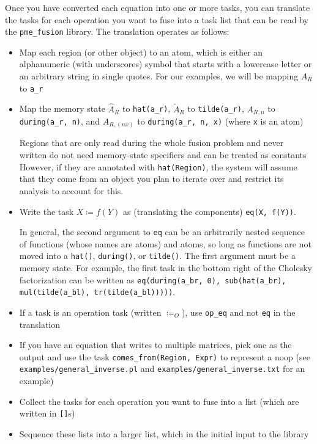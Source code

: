 \documentclass[12pt,letterpaper]{article}
\begin{document}
Once you have converted each equation into one or more tasks, you can translate the tasks for each operation you want to fuse into a task list that can be read by the \texttt{pme\_fusion} library.
The translation operates as follows:
\begin{itemize}
\item Map each region (or other object) to an atom, which is either an alphanumeric (with underscores) symbol that starts with a lowercase letter or an arbitrary string in single quotes. For our examples, we will be mapping $A_R$ to \texttt{a\_r}
\item Map the memory state $\hat{A}_R$ to \texttt{hat(a\_r)}, $\widetilde{A}_R$ to \texttt{tilde(a\_r)}, $A_{R, n}$ to \texttt{during(a\_r, n)}, and $A_{R, (n x)}$ to \texttt{during(a\_r, n, x)} (where \texttt{x} is an atom)

  Regions that are only read during the whole fusion problem and never written do not need memory-state specifiers and can be treated as constants
  However, if they are annotated with \texttt{hat(Region)}, the system will assume that they come from an object you plan to iterate over and restrict its analysis to account for this.
\item Write the task $X \coloneqq f(Y)$ as (translating the components) \texttt{eq(X, f(Y))}.

  In general, the second argument to \texttt{eq} can be an arbitrarily nested sequence of functions (whose names are atoms) and atoms, so long as functions are not moved into a \texttt{hat()}, \texttt{during()}, or \texttt{tilde()}. The first argument must be a memory state.
  For example, the first task in the bottom right of the Cholesky factorization can be written as \texttt{eq(during(a\_br, 0), sub(hat(a\_br), mul(tilde(a\_bl), tr(tilde(a\_bl)))))}.
\item If a task is an operation task (written $\coloneqq_O$), use \texttt{op\_eq} and not \texttt{eq} in the translation
\item If you have an equation that writes to multiple matrices, pick one as the output and use the task \texttt{comes\_from(Region, Expr)} to represent a noop (see \texttt{examples/general\_inverse.pl} and \texttt{examples/general\_inverse.txt} for an example)
\item Collect the tasks for each operation you want to fuse into a list (which are written in \texttt{[]}s)
\item Sequence these lists into a larger list, which in the initial input to the library
\end{itemize}
\end{document}
